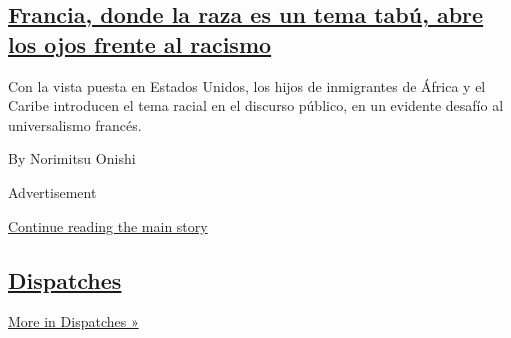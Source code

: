 \begin{enumerate}
  \hypertarget{francia-donde-la-raza-es-un-tema-tabuxfa-abre-los-ojos-frente-al-racismo}{%
  \subsection{\texorpdfstring{\href{/es/2020/07/17/espanol/mundo/racismo-francia-protestas.html}{Francia,
  donde la raza es un tema tabú, abre los ojos frente al
  racismo}}{Francia, donde la raza es un tema tabú, abre los ojos frente al racismo}}\label{francia-donde-la-raza-es-un-tema-tabuxfa-abre-los-ojos-frente-al-racismo}}

  Con la vista puesta en Estados Unidos, los hijos de inmigrantes de
  África y el Caribe introducen el tema racial en el discurso público,
  en un evidente desafío al universalismo francés.

  By Norimitsu Onishi
\end{enumerate}

Advertisement

\protect\hyperlink{after-mid2}{Continue reading the main story}

\hypertarget{dispatches}{%
\subsection{\texorpdfstring{\href{/spotlight/dispatches-international}{Dispatches}}{Dispatches}}\label{dispatches}}

\href{/spotlight/dispatches-international}{More in Dispatches »}

